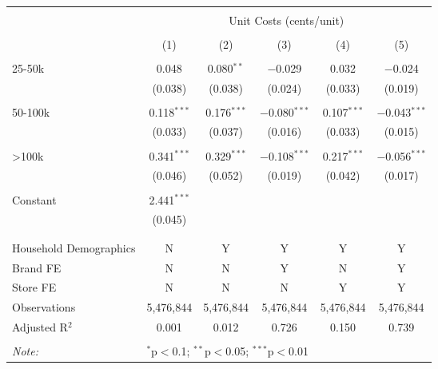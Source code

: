 
\begin{table}[!htbp] \centering 
  \caption{} 
  \label{} 
\begin{tabular}{@{\extracolsep{5pt}}lccccc} 
\\[-1.8ex]\hline 
\hline \\[-1.8ex] 
 & \multicolumn{5}{c}{Unit Costs (cents/unit)} \\ 
\cline{2-6} 
\\[-1.8ex] & (1) & (2) & (3) & (4) & (5)\\ 
\hline \\[-1.8ex] 
 25-50k & 0.048 & 0.080$^{**}$ & $-$0.029 & 0.032 & $-$0.024 \\ 
  & (0.038) & (0.038) & (0.024) & (0.033) & (0.019) \\ 
  & & & & & \\ 
 50-100k & 0.118$^{***}$ & 0.176$^{***}$ & $-$0.080$^{***}$ & 0.107$^{***}$ & $-$0.043$^{***}$ \\ 
  & (0.033) & (0.037) & (0.016) & (0.033) & (0.015) \\ 
  & & & & & \\ 
 >100k & 0.341$^{***}$ & 0.329$^{***}$ & $-$0.108$^{***}$ & 0.217$^{***}$ & $-$0.056$^{***}$ \\ 
  & (0.046) & (0.052) & (0.019) & (0.042) & (0.017) \\ 
  & & & & & \\ 
 Constant & 2.441$^{***}$ &  &  &  &  \\ 
  & (0.045) &  &  &  &  \\ 
  & & & & & \\ 
\hline \\[-1.8ex] 
Household Demographics & N & Y & Y & Y & Y \\ 
Brand FE & N & N & Y & N & Y \\ 
Store FE & N & N & N & Y & Y \\ 
Observations & 5,476,844 & 5,476,844 & 5,476,844 & 5,476,844 & 5,476,844 \\ 
Adjusted R$^{2}$ & 0.001 & 0.012 & 0.726 & 0.150 & 0.739 \\ 
\hline 
\hline \\[-1.8ex] 
\textit{Note:}  & \multicolumn{5}{l}{$^{*}$p$<$0.1; $^{**}$p$<$0.05; $^{***}$p$<$0.01} \\ 
\end{tabular} 
\end{table} 
